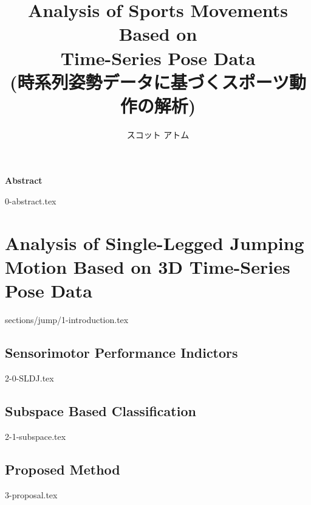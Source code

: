 \documentclass[a4paper,11pt]{report}
\title{Analysis of Sports Movements Based on \\Time-Series Pose Data \\ (時系列姿勢データに基づくスポーツ動作の解析)}
\author{スコット アトム}
\let\oldsection\section
\renewcommand\section{\clearpage\oldsection}
\begin{document}
\maketitle
\thispagestyle{empty}
\newpage

\begin{center}
	\thispagestyle{empty}
	{\Large \bf Abstract}
	\vspace{2cm}
\end{center}

{0-abstract.tex}
\par
\vspace{0pt plus 1fil}
\newpage

\tableofcontents
\listoffigures
\listoftables

\pagebreak \setcounter{page}{1}



\chapter{Analysis of Single-Legged Jumping Motion Based on 3D Time-Series Pose Data}
 {sections/jump/}{1-introduction.tex}

\section{Sensorimotor Performance Indictors}
{2-0-SLDJ.tex}

\section{Subspace Based Classification}
{2-1-subspace.tex}

\section{Proposed Method}
{3-proposal.tex}
\end{document}
